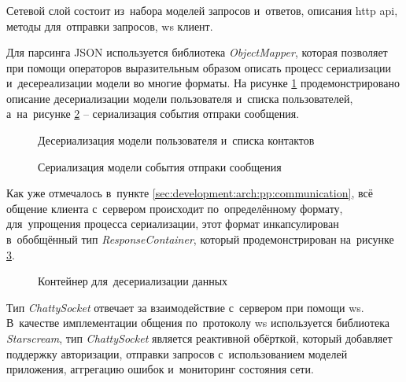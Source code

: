 \subsubsection{}
\label{sec:development:client:networking}

Сетевой слой состоит из~набора моделей запросов и~ответов, описания \gls{http} \gls{api}, методы для~отправки запросов, \gls{ws} клиент.

Для парсинга JSON используется библиотека \textit{ObjectMapper}, которая позволяет при помощи операторов выразительным образом описать процесс сериализации и~десереализации модели во многие форматы.
На рисунке \ref{sec:development:client:networking:code:deserialize} продемонстрировано описание десериализации модели пользователя и~списка пользователей, а~на~рисунке \ref{sec:development:client:networking:code:serialize} -- сериализация события отпраки сообщения.

\begin{figure}[h]
	
   \caption{Десериализация модели пользователя и~списка контактов}
   \label{sec:development:client:networking:code:deserialize}
\end{figure}

\begin{figure}[h]
	
   \caption{Сериализация модели события отпраки сообщения}
   \label{sec:development:client:networking:code:serialize}
\end{figure}

Как уже отмечалось в~пункте \ref{sec:development:arch:pp:communication}, всё общение клиента с~сервером происходит по~определённому формату, для~упрощения процесса сериализации, этот формат инкапсулирован в~обобщённый тип \textit{ResponseContainer}, который продемонстрирован на~рисунке \ref{sec:development:client:networking:code:deserialize:container}.

\begin{figure}[h]
	
   \caption{Контейнер для~десериализации данных}
   \label{sec:development:client:networking:code:deserialize:container}
\end{figure}

Тип \textit{ChattySocket} отвечает за взаимодействие с~сервером при помощи \gls{ws}. В~качестве имплементации общения по~протоколу \gls{ws} используется библиотека \textit{Starscream}, тип \textit{ChattySocket} является реактивной обёрткой, который добавляет поддержку авторизации, отправки запросов с~использованием моделей приложения, аггрегацию ошибок и~мониторинг состояния сети.

